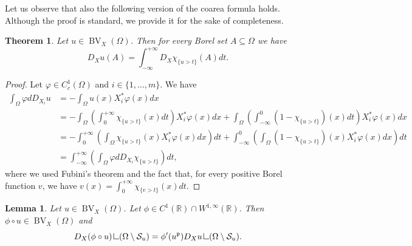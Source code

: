 \documentclass[10pt,a4paper]{amsart}
\newtheorem{teo}{Theorem}
\newtheorem{lem}{Lemma}
\newcommand{\R}{\mathbb{R}}
\newcommand{\bv}{\operatorname{BV}}
\newcommand{\p}{{\mathfrak{p}}}
\newcommand{\res} {\mathop{\hbox{\vrule height 7pt width .5pt depth 0pt \vrule height .5pt width 6pt depth 0pt}}\nolimits}
\newcommand{\s}{\mathcal{S}}
\newcommand{\se}{\subseteq}
\newcommand{\vp}{\varphi}
\begin{document}
Let us observe that also the following version of the coarea formula holds. Although the proof is standard, we provide it for the sake of completeness.
\begin{teo}\label{teo_coarea2}
    Let $u \in \bv_X(\Omega)$. Then for every Borel set $A \se \Omega$ we have
\[
D_Xu(A)=\int_{-\infty}^{+\infty} D_X \chi_{\{u >t\}}(A) dt.
\]
\end{teo}
\begin{proof}
    Let $\vp \in C^1_c(\Omega)$ and $i \in \{1,\dots,m\}$. We have
    \begin{align*}
        \int_\Omega \vp dD_{X_i}u&=-\int_\Omega u(x)X^*_i\vp(x)dx\\
        &=-\int_\Omega \left( \int_0^{+\infty} \chi_{\{u>t\}}(x)dt \right)X^*_i\vp(x)dx+\int_\Omega \left( \int_{-\infty}^0 (1- \chi_{\{u>t\}})(x)dt \right)X^*_i\vp(x)dx \\
        &=-\int_0^{+\infty} \left( \int_\Omega \chi_{\{u>t\}}(x)X^*_i\vp(x)dx \right)dt+\int_{-\infty}^0 \left(\int_\Omega  (1- \chi_{\{u>t\}})(x)X^*_i\vp(x)dx \right)dt\\
        &= \int_{-\infty}^{+\infty} \left( \int_\Omega \vp dD_{X_i} \chi_{\{ u>t \} } \right)dt,
    \end{align*}
    where we used Fubini's theorem and the fact that, for every positive Borel function $v$, we have $v(x)=\int_0^{+\infty} \chi_{ \{ v>t \} }(x)dt$.
\end{proof}

\begin{lem}\label{lemma_chain}
    Let $u \in \bv_X(\Omega)$. Let $\phi \in C^1(\R) \cap W^{1,\infty}(\R)$. Then $ \phi \circ u\in \bv_X(\Omega)$ and
    \begin{equation}\label{eq_chainrule}
    D_X(\phi \circ u) \res (\Omega \setminus \s_u) =\phi'(u^\p) D_Xu \res (\Omega \setminus \s_u).
    \end{equation}
\end{lem}
\end{document}

